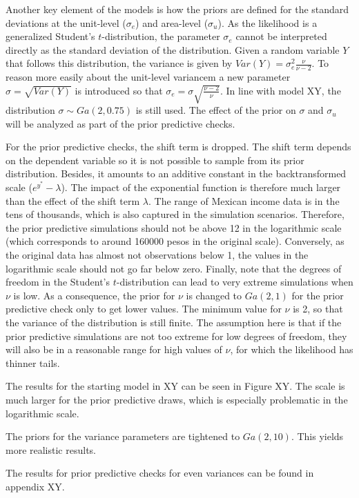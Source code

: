 Another key element of the models is how the priors are defined for the standard deviations at the unit-level ($\sigma_e$) and area-level ($\sigma_u$).
As the likelihood is a generalized Student's $t$-distribution, the parameter $\sigma_e$ cannot be interpreted directly as the standard deviation of the distribution.
Given a random variable $Y$ that follows this distribution, the variance is given by $Var(Y) = \sigma_e^2 \frac{\nu}{\nu - 2}$.
To reason more easily about the unit-level variancem a new parameter $\sigma = \sqrt{Var(Y)}$ is introduced so that $\sigma_e = \sigma \sqrt{\frac{\nu - 2}{\nu}}$.
In line with model XY, the distribution $\sigma \sim Ga(2, 0.75)$ is still used.
The effect of the prior on $\sigma$ and $\sigma_u$ will be analyzed as part of the prior predictive checks.

For the prior predictive checks, the shift term is dropped. The shift term depends on the dependent variable so it is not possible to sample from its prior distribution.
Besides, it amounts to an additive constant in the backtransformed scale ($e^{y^*} - \lambda$). The impact of the exponential function is therefore much larger than the effect of the shift term $\lambda$.
The range of Mexican income data is in the tens of thousands, which is also captured in the simulation scenarios.
Therefore, the prior predictive simulations should not be above 12 in the logarithmic scale (which corresponds to around 160000 pesos in the original scale).
Conversely, as the original data has almost not observations below 1, the values in the logarithmic scale should not go far below zero.
Finally, note that the degrees of freedom in the Student's $t$-distribution can lead to very extreme simulations when $\nu$ is low.
As a consequence, the prior for $\nu$ is changed to $Ga(2, 1)$ for the prior predictive check only to get lower values.
The minimum value for $\nu$ is 2, so that the variance of the distribution is still finite.
The assumption here is that if the prior predictive simulations are not too extreme for low degrees of freedom, they will also be in a reasonable range for high values of $\nu$, for which the likelihood has thinner tails.

The results for the starting model in XY can be seen in Figure XY.
The scale is much larger for the prior predictive draws, which is especially problematic in the logarithmic scale.

The priors for the variance parameters are tightened to $Ga(2, 10)$.
This yields more realistic results.

The results for prior predictive checks for even variances can be found in appendix XY.

